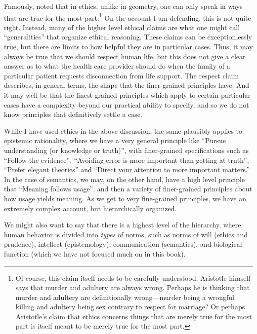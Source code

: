 Famously,  noted that in ethics, unlike in geometry, one can only speak in ways that are true for the most 
part.\footnote{Of course, this claim itself needs to be carefully understood. Aristotle himself says that murder and 
adultery are always wrong. Perhaps he is thinking that murder and adultery are definitionally wrong---murder being a wrongful 
killing and adultery being sex contrary to respect for marriage? Or perhaps Aristotle's claim that ethics concerns
things that are merely true for the most part is itself meant to be merely true for the most part.} On the account I am defending, this is not quite right. Instead,
many of the higher level ethical claims are what one might call ``generalities'' that organize ethical reasoning. These claims 
can be exceptionlessly true, but there are limits to how helpful they are in particular cases. Thus, it may always be true that we 
should respect human life, but this does not give a clear answer as to what the health care provider should do when the family of 
a particular patient requests disconnection from life support. The respect claim describes, in general terms, the shape that the 
finer-grained principles have. And it may well be that the finest-grained principles which apply to certain particular cases
have a complexity beyond our practical ability to specify, and so we do not know principles that definitively settle a case.

While I have used ethics in the above discussion, the same plausibly applies to epistemic rationality, where we have a very general
principle like ``Pursue understanding (or knowledge or truth)'', with finer-grained specifications such as ``Follow the evidence'',
``Avoiding error is more important than getting at truth'', ``Prefer elegant theories'' and ``Direct your attention to more important matters.'' 
In the case
of semantics, we may, on the other hand, have a high level principle that ``Meaning follows usage'', and then a variety of finer-grained 
principles about how usage yields meaning. As we get to very fine-grained principles, we have an extremely complex account, but hierarchically
organized.

We might also want to say that there is a highest level of the hierarchy, where human behavior is divided into
\textit{types} of norms, such as norms of will (ethics and prudence), intellect (epistemology), communication
(semantics), and biological function (which we have not focused much on in this book).

